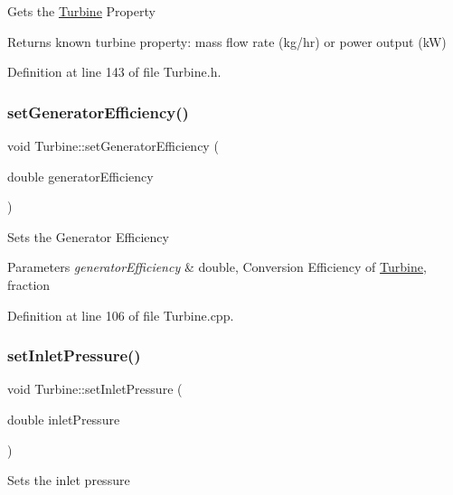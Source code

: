 Gets the \hyperlink{class_turbine}{Turbine} Property

\begin{DoxyReturn}{Returns}
known turbine property\+: mass flow rate (kg/hr) or power output (kW) 
\end{DoxyReturn}


Definition at line 143 of file Turbine.\+h.

\mbox{\label{class_turbine_a51e9c5050a5be51b86dc23e690bd3f40}} 
\subsubsection{\texorpdfstring{set\+Generator\+Efficiency()}{setGeneratorEfficiency()}}
{\footnotesize\ttfamily void Turbine\+::set\+Generator\+Efficiency (\begin{DoxyParamCaption}\item[{double}]{generator\+Efficiency }\end{DoxyParamCaption})}

Sets the Generator Efficiency


\begin{DoxyParams}{Parameters}
{\em generator\+Efficiency} & double, Conversion Efficiency of \hyperlink{class_turbine}{Turbine}, fraction \\
\hline
\end{DoxyParams}


Definition at line 106 of file Turbine.\+cpp.

\mbox{\label{class_turbine_a04996baab9a40d449a69c737c00be8e4}} 
\subsubsection{\texorpdfstring{set\+Inlet\+Pressure()}{setInletPressure()}}
{\footnotesize\ttfamily void Turbine\+::set\+Inlet\+Pressure (\begin{DoxyParamCaption}\item[{double}]{inlet\+Pressure }\end{DoxyParamCaption})}

Sets the inlet pressure


